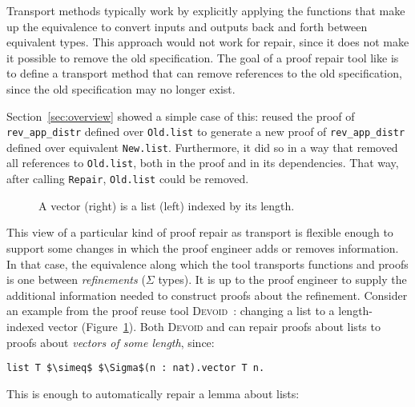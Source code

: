 Transport methods typically work by explicitly applying the functions that make up the equivalence to convert
inputs and outputs back and forth between equivalent types.
This approach would not work for repair, since it does not make it possible to remove the old specification.
The goal of a proof repair tool like \toolname is to define a transport method that
can remove references to the old specification, %
since the old specification may no longer exist.

Section~\ref{sec:overview} showed a simple case of this: \toolname
reused the proof of \lstinline{rev_app_distr} defined over \lstinline{Old.list}
to generate a new proof of \lstinline{rev_app_distr} defined over equivalent \lstinline{New.list}.
Furthermore, it did so in a way that removed all references to \lstinline{Old.list}, both in the proof
and in its dependencies.
That way, after calling \lstinline{Repair}, \lstinline{Old.list} could be removed.

\begin{figure}
\begin{minipage}{0.40\textwidth}
   
\end{minipage}
\hfill
\begin{minipage}{0.58\textwidth}
   
\end{minipage}
\vspace{-0.3cm}
\caption{A vector (right) is a list (left) indexed by its length.}
\label{fig:listtovect}
\end{figure}

This view of a particular kind of proof repair as transport is flexible enough to support some changes in which the proof engineer adds or removes information.
In that case, the equivalence along which the tool transports functions and proofs
is one between \textit{refinements} ($\Sigma$ types).
It is up to the proof engineer to supply the additional information needed to construct proofs about the refinement.
Consider an example from the proof reuse tool \textsc{Devoid}~\cite{Ringer2019}:
changing a list to a length-indexed vector (Figure~\ref{fig:listtovect}).
Both \textsc{Devoid} and \toolname can repair proofs about lists to proofs about \textit{vectors of some length}, since:

\begin{lstlisting}
list T $\simeq$ $\Sigma$(n : nat).vector T n.
\end{lstlisting}
This is enough to automatically repair a lemma about lists:

